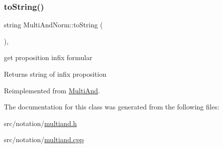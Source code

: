 \subsubsection{\texorpdfstring{to\+String()}{toString()}}
{\footnotesize\ttfamily string Multi\+And\+Norm\+::to\+String (\begin{DoxyParamCaption}{ }\end{DoxyParamCaption})\hspace{0.3cm}{\ttfamily [override]}, {\ttfamily [virtual]}}



get proposition infix formular 

\begin{DoxyReturn}{Returns}
string of infix proposition 
\end{DoxyReturn}


Reimplemented from \hyperlink{class_multi_and_a035299de4f81beb44a9a5df63b0d5178}{Multi\+And}.



The documentation for this class was generated from the following files\+:\begin{DoxyCompactItemize}
\item 
src/notation/\hyperlink{multiand_8h}{multiand.\+h}\item 
src/notation/\hyperlink{multiand_8cpp}{multiand.\+cpp}\end{DoxyCompactItemize}
